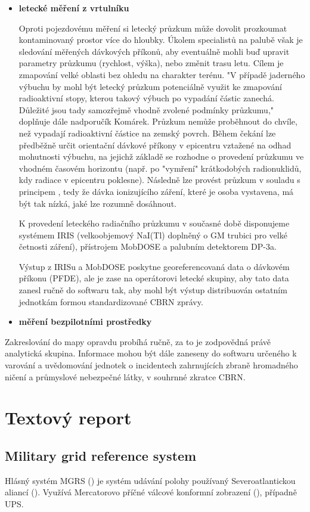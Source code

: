 \begin{itemize}
	\item \textbf{letecké měření z vrtulníku}
	
	Oproti pojezdovému měření si letecký průzkum může dovolit prozkoumat kontaminovaný prostor více do hloubky. Úkolem specialistů na palubě však je sledování měřených dávkových příkonů, aby eventuálně mohli buď upravit parametry průzkumu (rychlost, výška), nebo změnit trasu letu. Cílem je zmapování velké oblasti bez ohledu na charakter terénu. 
	"V případě jaderného výbuchu by mohl být letecký průzkum potenciálně využit ke zmapování radioaktivní stopy, kterou takový výbuch po vypadání částic zanechá. Důležité jsou tady samozřejmě vhodně zvolené podmínky průzkumu," doplňuje dále nadporučík Komárek. 
	Průzkum nemůže proběhnout do chvíle, než vypadají radioaktivní částice na zemský povrch. Během čekání lze předběžně určit orientační dávkové příkony v epicentru vztažené na odhad mohutnosti výbuchu, na jejichž základě se rozhodne o provedení průzkumu ve vhodném časovém horizontu (např. po "vymření" krátkodobých radionuklidů, kdy radiace v epicentru poklesne). Následně lze provést průzkum v souladu s principem , tedy že dávka ionizujícího záření, které je osoba vystavena, má být tak nízká, jaké lze rozumně dosáhnout.
	
	K provedení leteckého radiačního průzkumu v současné době disponujeme systémem IRIS (velkoobjemový NaI(Tl) doplněný o GM trubici pro velké četnosti záření), přístrojem MobDOSE a palubním detektorem DP-3a.

	Výstup z IRISu a MobDOSE poskytne georeferencovaná data o dávkovém příkonu (PFDE), ale je zase na operátorovi letecké skupiny, aby tato data zanesl ručně do softwaru tak, aby mohl být výstup distribuován ostatním jednotkám formou standardizované CBRN zprávy.

	\item \textbf{měření bezpilotními prostředky}
\end{itemize}

	Zakreslování do mapy opravdu probíhá ručně, za to je zodpovědná právě analytická skupina. Informace mohou být dále zaneseny do softwaru určeného k varování a uvědomování jednotek o incidentech zahrnujících zbraně hromadného ničení a průmyslové nebezpečné látky, v souhrnné zkratce CBRN. 
	

\section{Textový report}


\subsection{Military grid reference system}
Hlásný systém MGRS () je systém udávání polohy používaný Severoatlantickou aliancí (). Využívá Mercatorovo příčné válcové konformní zobrazení (), případně UPS. 

